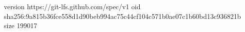 version https://git-lfs.github.com/spec/v1
oid sha256:9a815b36fce558d1d90beb994ac75c44cf104c571b0ae07c1b60bd13c936821b
size 199017
